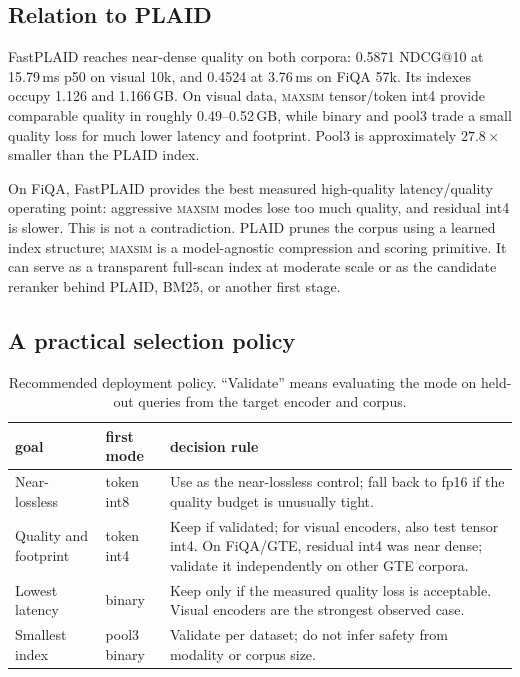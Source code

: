 \documentclass{article}
\makeatletter
\newcommand{\sysname}{\textsc{maxsim}}
\newcommand{\ndcg}{NDCG@10}
\makeatother
\begin{document}
\subsection{Relation to PLAID}
\label{sec:plaid}

\begin{table}[t]
\centering
\caption{Matched FastPLAID measurements. PLAID is approximate; \sysname{}
rows are full scans over compressed representations, so index size and
latency are not strictly apples-to-apples.}
\label{tab:plaid}
\footnotesize
\resizebox{\linewidth}{!}{}
\end{table}

FastPLAID reaches near-dense quality on both corpora: 0.5871 \ndcg{} at
15.79\,ms p50 on visual 10k, and 0.4524 at 3.76\,ms on FiQA 57k. Its indexes
occupy 1.126 and 1.166\,GB. On visual data, \sysname{} tensor/token int4
provide comparable quality in roughly 0.49--0.52\,GB, while binary and pool3
trade a small quality loss for much lower latency and footprint. Pool3 is
approximately $27.8\times$ smaller than the PLAID index.

On FiQA, FastPLAID provides the best measured high-quality latency/quality
operating point: aggressive \sysname{} modes lose too much quality, and
residual int4 is slower. This is not a contradiction. PLAID prunes the corpus
using a learned index structure; \sysname{} is a model-agnostic compression
and scoring primitive. It can serve as a transparent full-scan index at
moderate scale or as the candidate reranker behind PLAID, BM25, or another
first stage.

\subsection{A practical selection policy}

\begin{table}[t]
\centering
\caption{Recommended deployment policy. ``Validate'' means evaluating the
mode on held-out queries from the target encoder and corpus.}
\label{tab:policy}
\small
\begin{tabular}{p{.20\linewidth}p{.25\linewidth}p{.47\linewidth}}
\toprule
goal & first mode & decision rule \\
\midrule
Near-lossless & token int8 & Use as the near-lossless control;
fall back to fp16 if the quality budget is unusually tight. \\
Quality and footprint & token int4 & Keep if validated; for visual encoders,
also test tensor int4. On FiQA/GTE, residual int4 was near dense; validate it
independently on other GTE corpora. \\
Lowest latency & binary & Keep only if the measured quality loss is
acceptable. Visual encoders are the strongest observed case. \\
Smallest index & pool3 binary & Validate per dataset; do not infer safety
from modality or corpus size. \\
\bottomrule
\end{tabular}
\end{table}
\end{document}
